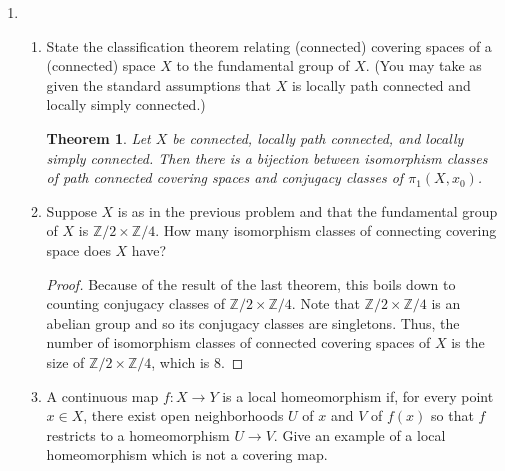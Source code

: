 \documentclass{article}
\newtheorem*{theorem}{Theorem}
\begin{document}
\begin{enumerate}
\begin{enumerate}
\begin{proof}
		To compute $N$, we note that since $i_U, i_V$ are group homomorphisms, they take the identity to the identity, and since the only $g \in \pi_1(U \cap V)$ is exactly the identity, then \[N = \langle i_U(e)i_V(e)^{-1}, i_V(e)i_U(e)^{-1} \rangle = \langle e \rangle\] so $N$ is the trivial group.
		
		Now since $N$ is trivial, $\pi_1(U)* \pi_1(V)/N \cong\pi_1(U)* \pi_1(V) \cong \mathbb{Z}*\mathbb{Z}$
		\end{proof}
		
		\end{enumerate}
		
\item 	\begin{enumerate}
			\item State the classification theorem relating (connected) covering spaces of a (connected) space $X$ to the fundamental group of $X$. (You may take as given the standard assumptions that $X$ is locally path connected and locally simply connected.)
			
			\begin{theorem}
				Let $X$ be connected, locally path connected, and locally simply connected. Then there is a bijection between isomorphism classes of path connected covering spaces and conjugacy classes of $\pi_1(X, x_0)$.
			\end{theorem}
			
			\item Suppose $X$ is as in the previous problem and that the fundamental group of $X$ is $\mathbb{Z}/2 \times \mathbb{Z}/4$. How many isomorphism classes of connecting covering space does $X$ have?
			
			\begin{proof}
				Because of the result of the last theorem, this boils down to counting conjugacy classes of $\mathbb{Z}/2 \times \mathbb{Z}/4$.
				Note that $\mathbb{Z}/2 \times \mathbb{Z}/4$ is an abelian group and so its conjugacy classes are singletons. 
				Thus, the number of isomorphism classes of connected covering spaces of $X$
				 is the size of $\mathbb{Z}/2 \times \mathbb{Z}/4$, which is 8.
			\end{proof}
			
			\item A continuous map $f:X \rightarrow Y$ is a local homeomorphism if, for every point $x \in X$, there exist open neighborhoods $U$ of $x$ and $V$ of $f(x)$ so that $f$ restricts to a homeomorphism $U \rightarrow V$. Give an example of a local homeomorphism which is not a covering map.
		\end{enumerate}
		

\end{enumerate}
\end{document}
